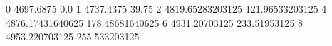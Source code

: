 0 4697.6875 0.0
1 4737.4375 39.75
2 4819.65283203125 121.96533203125
4 4876.17431640625 178.48681640625
6 4931.20703125 233.51953125
8 4953.220703125 255.533203125
